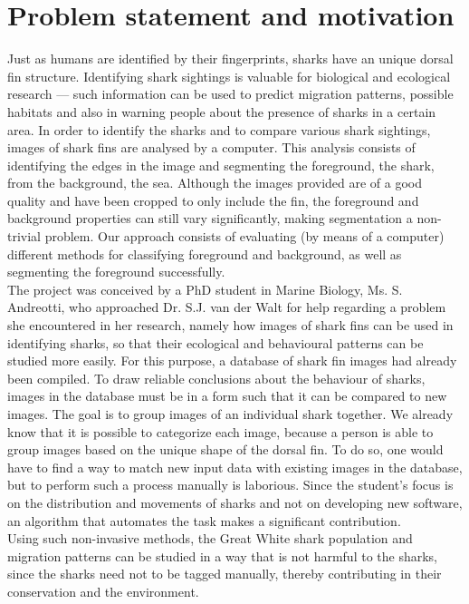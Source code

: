 \documentclass[a4paper,10pt]{article}
\begin{document}
\newpage
\tableofcontents

\newpage
\section{Problem statement and motivation}
Just as humans are identified by their fingerprints, sharks have an unique
dorsal fin structure.  Identifying shark sightings is
valuable for biological and ecological research --- such information can be used to predict migration
patterns, possible habitats and also in warning people about the
  presence of sharks in a certain area.  In order to identify the sharks and to compare various shark sightings,
images of
shark fins are analysed by a computer. 
This analysis consists of identifying the edges in the image and segmenting the
foreground, the shark, from the background, the sea.
Although the images provided are of a good quality and have been cropped
to only include the fin, the
foreground and background properties can still vary significantly, making
segmentation a
non-trivial problem. Our approach consists of
evaluating (by means of a computer) different methods for classifying foreground
and background, as well as segmenting the foreground successfully.  \\

The project was conceived by a PhD
student in Marine Biology, Ms. S. Andreotti, who approached Dr. S.J. van der Walt for
help regarding a problem she encountered in her research, namely
how images of shark fins  can be used in identifying sharks, so that their
ecological and behavioural patterns can be studied more easily.
For this purpose, a database of shark fin images had already been compiled.
To
draw reliable conclusions about the behaviour of sharks, images in the
database must be in a form such that it can be compared to new images.
The goal is to group images of an individual shark together.  We
already know that it is possible to categorize each image, because a
  person is able to group images based on the unique shape of the
dorsal fin.  To do so, one would have to find a way to match new
input data with existing images in the database, but to perform such a
  process manually is laborious. 
Since the student's 
focus is on the distribution and movements of sharks and not on developing new
software, an algorithm that automates the task makes a significant contribution. \\

Using such non-invasive methods, the Great White shark population and migration
patterns can be studied in a way that is not harmful to
the sharks, since the sharks need not to be tagged manually, thereby
contributing in their conservation and the environment.  
\end{document}
